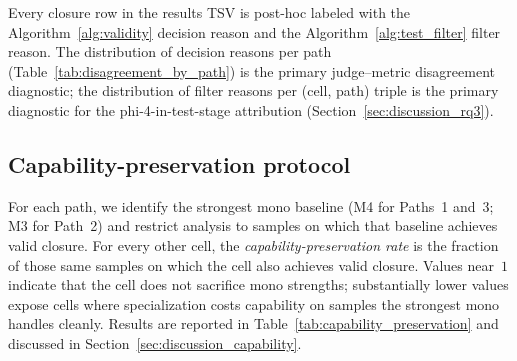 Every closure row in the results TSV is post-hoc labeled with the
Algorithm~\ref{alg:validity} decision reason and the
Algorithm~\ref{alg:test_filter} filter reason. The distribution of
decision reasons per path (Table~\ref{tab:disagreement_by_path}) is
the primary judge--metric disagreement diagnostic; the distribution of
filter reasons per (cell, path) triple is the primary diagnostic for
the phi-4-in-test-stage attribution (Section~\ref{sec:discussion_rq3}).

\subsection{Capability-preservation protocol}
\label{sec:appendix_capability_protocol}
\label{sec:experiment_setup_capability}

For each path, we identify the strongest mono baseline (M4 for
Paths~1 and~3; M3 for Path~2) and restrict analysis to samples on
which that baseline achieves valid closure. For every other cell, the
\emph{capability-preservation rate} is the fraction of those same
samples on which the cell also achieves valid closure. Values near~$1$
indicate that the cell does not sacrifice mono strengths; substantially
lower values expose cells where specialization costs capability on
samples the strongest mono handles cleanly. Results are reported in
Table~\ref{tab:capability_preservation} and discussed in
Section~\ref{sec:discussion_capability}.
